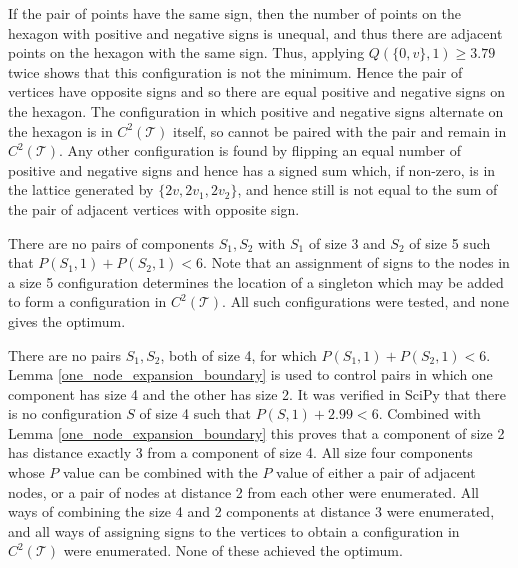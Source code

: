 \documentclass[a4paper, 12pt, notitlepage]{amsart}
\newcommand{\sT}{\mathscr{T}}
\theoremstyle{remark}
\begin{document}
 
 If the pair of points have the same sign, then the number of points on the hexagon with positive and negative signs is unequal, and thus there are adjacent points on the hexagon with the same sign.  Thus, applying $Q(\{0,v\}, 1) \geq 3.79$ twice shows that this configuration is not the minimum.  Hence the pair of vertices have opposite signs and so there are equal positive and negative signs on the hexagon.  The configuration in which positive and negative signs alternate on the hexagon is in $C^2(\sT)$ itself, so cannot be paired with the pair and remain in $C^2(\sT)$.  Any other configuration is found by flipping an equal number of positive and negative signs and hence has a signed sum which, if non-zero, is in the lattice generated by $\{2v, 2v_1, 2v_2\}$, and hence still is not equal to the sum of the pair of adjacent vertices with opposite sign.
 
 There are no pairs of components $S_1, S_2$ with $S_1$ of size 3 and $S_2$ of size 5 such that $P(S_1, 1) + P(S_2, 1) < 6$. Note that an assignment of signs to the nodes in a size 5 configuration determines the location of a singleton which may be added to form a configuration in $C^2(\sT)$.  All such configurations were tested, and none gives the optimum. 
 
 There are no pairs $S_1, S_2$, both of size 4, for which $P(S_1, 1) + P(S_2, 1) < 6$. Lemma  \ref{one_node_expansion_boundary} is used to control pairs in which one component has size 4 and the other has size 2.
 It was verified in SciPy that there is no configuration $S$ of size 4 such that $P(S,1) + 2.99 < 6$.  Combined with Lemma \ref{one_node_expansion_boundary} this proves that a component of size 2 has distance exactly 3 from a component of size 4.  All size four components whose $P$ value can be combined with the $P$ value of either a pair of adjacent nodes, or a pair of nodes at distance 2 from each other were enumerated.  All ways of combining the size 4 and 2 components at distance 3 were enumerated, and all ways of assigning signs to the vertices to obtain a configuration in $C^2(\sT)$ were enumerated.  None of these achieved the optimum.
 
\end{document}
